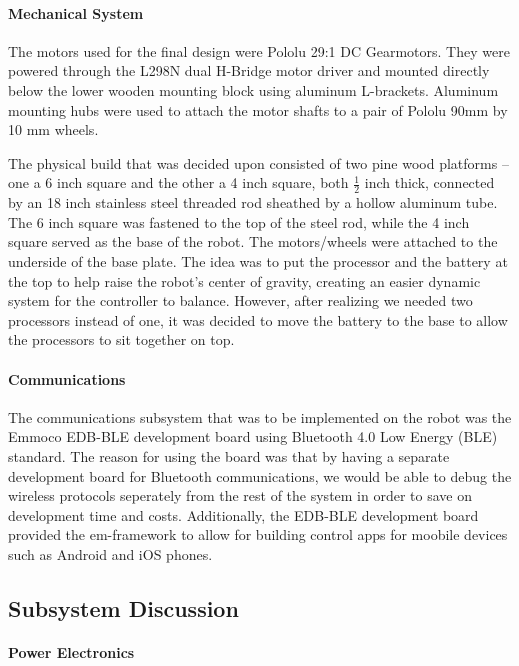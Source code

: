 \documentclass[11pt]{report}
\begin{document}
\begin{spacing}{1.5}
        \paragraph{Mechanical System}
        
        The motors used for the final design were Pololu 29:1 DC Gearmotors.  They were powered through the L298N dual H-Bridge motor driver and mounted directly below the lower wooden mounting block using aluminum L-brackets. Aluminum mounting hubs were used to attach the motor shafts to a pair of Pololu 90mm by 10 mm wheels. 
        
        The physical build that was decided upon consisted of two pine wood platforms – one a 6 inch square and the other a 4 inch square, both $\frac{1}{2}$ inch thick, connected by an 18 inch stainless steel threaded rod sheathed by a hollow aluminum tube. The 6 inch square was fastened to the top of the steel rod, while the 4 inch square served as the base of the robot. The motors/wheels were attached to the underside of the base plate. The idea was to put the processor and the battery at the top to help raise the robot’s center of gravity, creating an easier dynamic system for the controller to balance. However, after realizing we needed two processors instead of one, it was decided to move the battery to the base to allow the processors to sit together on top. 
        
        \paragraph{Communications}
        
        The communications subsystem that was to be implemented on the robot was the Emmoco EDB-BLE development board using Bluetooth 4.0 Low Energy (BLE) standard. The reason for using the board was that by having a separate development board for Bluetooth communications, we would be able to debug the wireless protocols seperately from the rest of the system in order to save on development time and costs. Additionally, the EDB-BLE development board provided the em-framework to allow for building control apps for moobile devices such as Android and iOS phones.
        

    \subsection*{Subsystem Discussion}
    
        \paragraph{Power Electronics}
        

\end{spacing}
\end{document}
